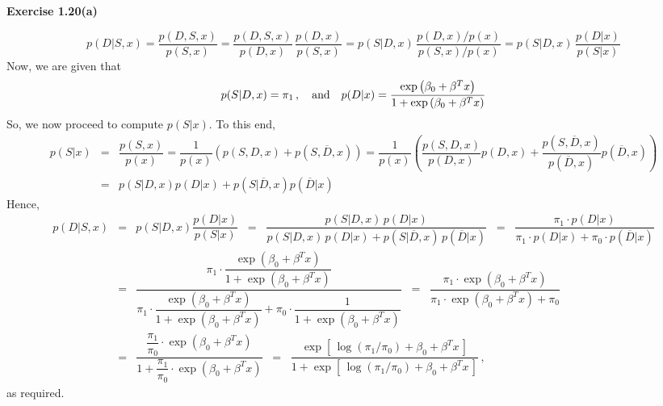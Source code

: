 
\newcommand{ \expB}{\exp\left(\beta_{0}+\beta^{T}x\right)}
\newcommand{\explB}{\exp\left[\,\log(\pi_{1}/\pi_{0})+\beta_{0}+\beta^{T}x\,\right]}

\newcommand{ \expBstar}{\exp\left(\beta_{0}+\beta^{T}x^{*}\right)}
\newcommand{\explBstar}{\exp\left[\,\log(\pi_{1}/\pi_{0})+\beta_{0}+\beta^{T}x^{*}\,\right]}

\noindent
\textbf{Exercise 1.20(a)}

\vskip 0.5cm
\noindent
\begin{equation*}
p(D\vert S,x)
= \dfrac{p(D,S,x)}{p(S,x)}
= \dfrac{p(D,S,x)}{p(D,x)}\,\dfrac{p(D,x)}{p(S,x)}
= p(S\vert D,x)\,\dfrac{p(D,x)/p(x)}{p(S,x)/p(x)}
= p(S\vert D,x)\,\dfrac{p(D \vert x)}{p(S \vert x)}
\end{equation*}
Now, we are given that
\begin{equation*}
p(S \vert D,x) = \pi_{1}\,,
\quad\textnormal{and}\quad
p(D \vert x) = \dfrac{\expB}{1+\expB}
\end{equation*}
So, we now proceed to compute $p(S \vert x)$.
To this end,
\begin{eqnarray*}
p(S \vert x)
& = & \dfrac{p(S,x)}{p(x)}
= \dfrac{1}{p(x)}\left( p(S,D,x) + p(S,\overline{D},x) \right)
= \dfrac{1}{p(x)}\left(
  \dfrac{p(S,D,x)}{p(D,x)}p(D,x) + \dfrac{p(S,\overline{D},x)}{p(\overline{D},x)}p(\overline{D},x)
  \right) \\
& = &
p(S \vert D,x) p(D \vert x) + p(S \vert \overline{D},x) p(\overline{D} \vert x)
\end{eqnarray*}
Hence,
\begin{eqnarray*}
p(D \vert S,x)
& = &
p(S \vert D,x) \dfrac{p(D \vert x)}{p(S \vert x)}
\;\; = \;\;
\dfrac{p(S\vert D,x)\,p(D\vert x)}{p(S\vert D,x)\,p(D\vert x)+p(S\vert\overline{D},x)\,p(\overline{D}\vert x)}
\;\; = \;\;
\dfrac{\pi_{1}\cdot p(D\vert x)}{\pi_{1}\cdot p(D\vert x)+\pi_{0}\cdot p(\overline{D}\vert x)}
\\
& = &
\dfrac{\pi_{1}\cdot\dfrac{\expB}{1+\expB}}
{\pi_{1}\cdot\dfrac{\expB}{1+\expB} + \pi_{0}\cdot\dfrac{1}{1+\expB}}
\;\; = \;\;
\dfrac{\pi_{1}\cdot\expB}{\pi_{1}\cdot\expB + \pi_{0}}
\\
& = &
\dfrac{\dfrac{\pi_{1}}{\pi_{0}}\cdot\expB}{1 + \dfrac{\pi_{1}}{\pi_{0}}\cdot\expB}
\;\; = \;\;
\dfrac{\explB}{1 + \explB}\,,
\end{eqnarray*}
as required.

